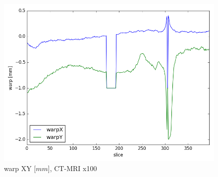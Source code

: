 \documentclass[parskip,bibtotoc,final,twoside=false,titlepage,a4paper,english,12pt,titlepage,a4paper]{scrbook}
\begin{document}
\begin{figure}[!bp]
  \centering
  \includegraphics[scale=0.65]{python/warp/warpXY_x100--.png}
  \caption{warp XY [$mm$], CT-MRI x100}
  \label{fig:warpXY_x100}
\end{figure}

\newpage
\end{document}
